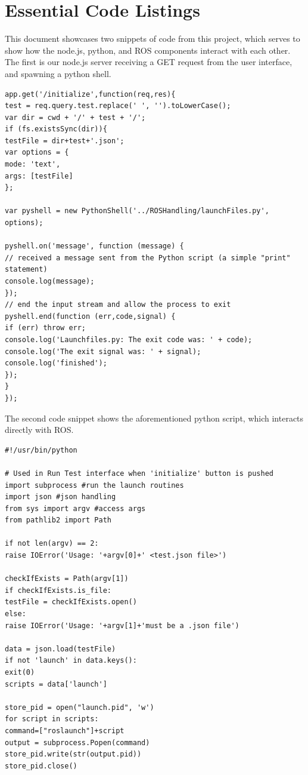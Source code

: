 \documentclass[onecolumn, draftclsnofoot,10pt, compsoc]{report}
\begin{document}
\chapter{Essential Code Listings}
\minitoc
This document showcases two snippets of code from this project, which serves to show how the node.js, python, and ROS components interact with each other.
\\
The first is our node.js server receiving a GET request from the user interface, and spawning a python shell.\\
\begin{verbatim}
app.get('/initialize',function(req,res){
test = req.query.test.replace(' ', '').toLowerCase();
var dir = cwd + '/' + test + '/';
if (fs.existsSync(dir)){
testFile = dir+test+'.json';
var options = {
mode: 'text',
args: [testFile]
};

var pyshell = new PythonShell('../ROSHandling/launchFiles.py', options);

pyshell.on('message', function (message) {
// received a message sent from the Python script (a simple "print" statement)
console.log(message);
});
// end the input stream and allow the process to exit
pyshell.end(function (err,code,signal) {
if (err) throw err;
console.log('Launchfiles.py: The exit code was: ' + code);
console.log('The exit signal was: ' + signal);
console.log('finished');
});
}
});
\end{verbatim}
The second code snippet shows the aforementioned python script, which interacts directly with ROS.
\begin{verbatim}
#!/usr/bin/python

# Used in Run Test interface when 'initialize' button is pushed
import subprocess #run the launch routines
import json #json handling
from sys import argv #access args
from pathlib2 import Path

if not len(argv) == 2:
raise IOError('Usage: '+argv[0]+' <test.json file>')

checkIfExists = Path(argv[1])
if checkIfExists.is_file:
testFile = checkIfExists.open()
else:
raise IOError('Usage: '+argv[1]+'must be a .json file')	

data = json.load(testFile)
if not 'launch' in data.keys():
exit(0)
scripts = data['launch']

store_pid = open("launch.pid", 'w')
for script in scripts:
command=["roslaunch"]+script
output = subprocess.Popen(command) 
store_pid.write(str(output.pid))
store_pid.close()
\end{verbatim}
\end{document}
